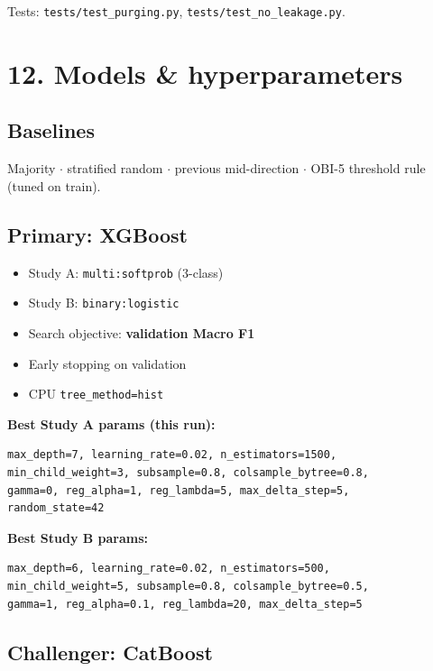 \documentclass[11pt,a4paper]{article}
\begin{document}
Tests: \texttt{tests/test\_purging.py}, \texttt{tests/test\_no\_leakage.py}.


\vspace{0.5em}

\section{12. Models \& hyperparameters}

\subsection{Baselines}

Majority $\cdot$ stratified random $\cdot$ previous mid-direction $\cdot$ OBI-5 threshold rule (tuned on train).


\subsection{Primary: XGBoost}

\begin{itemize}
\item Study A: \texttt{multi:softprob} (3-class)
\item Study B: \texttt{binary:logistic}
\item Search objective: \textbf{validation Macro F1}
\item Early stopping on validation
\item CPU \texttt{tree\_method=hist}
\end{itemize}

\textbf{Best Study A params (this run):}


\begin{verbatim}
max_depth=7, learning_rate=0.02, n_estimators=1500,
min_child_weight=3, subsample=0.8, colsample_bytree=0.8,
gamma=0, reg_alpha=1, reg_lambda=5, max_delta_step=5,
random_state=42
\end{verbatim}

\textbf{Best Study B params:}


\begin{verbatim}
max_depth=6, learning_rate=0.02, n_estimators=500,
min_child_weight=5, subsample=0.8, colsample_bytree=0.5,
gamma=1, reg_alpha=0.1, reg_lambda=20, max_delta_step=5
\end{verbatim}

\subsection{Challenger: CatBoost}
\end{document}
